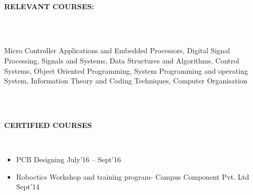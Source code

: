 \documentclass[a4paper,12pt]{report}
\begin{document}
\begin{adjustwidth}{-0.59in}{-0.52in}
\\
\vspace{1cm}
\textbf{RELEVANT COURSES:} 
\end{adjustwidth}
 \\
\begin{adjustwidth}{-0.59in}{0.0in}
\\
Micro Controller Applications and Embedded Processors, Digital Signal Processing, Signals and Systems, Data Structures and Algorithms, Control Systems, Object Oriented Programming, System Programming and operating System, Information Theory and Coding Techniques, Computer Organisation
\end{adjustwidth}
 \\
\vspace{12pt}


\begin{adjustwidth}{-0.59in}{-0.52in}
\\
\vspace{1cm}
\textbf{CERTIFIED COURSES}
\end{adjustwidth}
 \\
\begin{itemize}
\item PCB Designing \hspace*{20pt}  \hspace*{20pt}        \hspace*{20pt}                                                                                            July’16 – Sept’16 \\
\item Roboctics Workshop and training program- Campus Component Pvt. Ltd         \hspace*{20pt}                    Sept’14 \\
\vspace{12pt}
\end{itemize}
\end{document}
